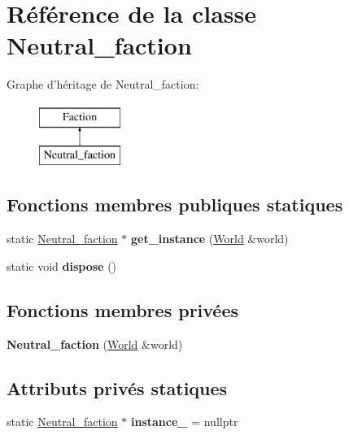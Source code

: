 \hypertarget{classNeutral__faction}{\section{Référence de la classe Neutral\-\_\-faction}
\label{classNeutral__faction}
}
Graphe d'héritage de Neutral\-\_\-faction\-:\begin{figure}[H]
\begin{center}
\leavevmode
\includegraphics[height=2.000000cm]{classNeutral__faction}
\end{center}
\end{figure}
\subsection*{Fonctions membres publiques statiques}
\begin{DoxyCompactItemize}
\item 
\hypertarget{classNeutral__faction_ae8e449bd58cfac78bc8cac249c7d1352}{static \hyperlink{classNeutral__faction}{Neutral\-\_\-faction} $\ast$ {\bfseries get\-\_\-instance} (\hyperlink{classWorld}{World} \&world)}\label{classNeutral__faction_ae8e449bd58cfac78bc8cac249c7d1352}

\item 
\hypertarget{classNeutral__faction_a1b42cda1fbc38de7408963f63e494d97}{static void {\bfseries dispose} ()}\label{classNeutral__faction_a1b42cda1fbc38de7408963f63e494d97}

\end{DoxyCompactItemize}
\subsection*{Fonctions membres privées}
\begin{DoxyCompactItemize}
\item 
\hypertarget{classNeutral__faction_aacd2a58a4ba2b640bac83a730bfaeeec}{{\bfseries Neutral\-\_\-faction} (\hyperlink{classWorld}{World} \&world)}\label{classNeutral__faction_aacd2a58a4ba2b640bac83a730bfaeeec}

\end{DoxyCompactItemize}
\subsection*{Attributs privés statiques}
\begin{DoxyCompactItemize}
\item 
\hypertarget{classNeutral__faction_acf5e8d031f701352fb71a65568e9eb77}{static \hyperlink{classNeutral__faction}{Neutral\-\_\-faction} $\ast$ {\bfseries instance\-\_\-} = nullptr}\label{classNeutral__faction_acf5e8d031f701352fb71a65568e9eb77}

\end{DoxyCompactItemize}
